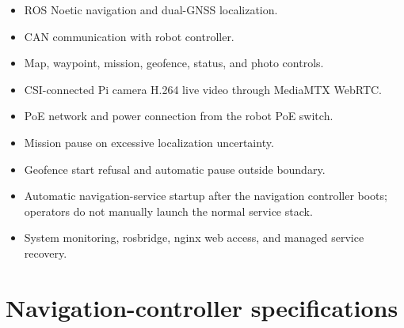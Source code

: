 \documentclass[
  10pt,
  letterpaper,
  openany]{report}
\providecommand{\tightlist}{%
  \setlength{\itemsep}{0pt}\setlength{\parskip}{0pt}}
\begin{document}
\begin{itemize}
\tightlist
\item
  ROS Noetic navigation and dual-GNSS localization.
\item
  CAN communication with robot controller.
\item
  Map, waypoint, mission, geofence, status, and photo controls.
\item
  CSI-connected Pi camera H.264 live video through MediaMTX WebRTC.
\item
  PoE network and power connection from the robot PoE switch.
\item
  Mission pause on excessive localization uncertainty.
\item
  Geofence start refusal and automatic pause outside boundary.
\item
  Automatic navigation-service startup after the navigation controller
  boots; operators do not manually launch the normal service stack.
\item
  System monitoring, rosbridge, nginx web access, and managed service
  recovery.
\end{itemize}

\protect{}\label{nav-specs}
\section{Navigation-controller
specifications}\label{navigation-controller-specifications}
\end{document}
